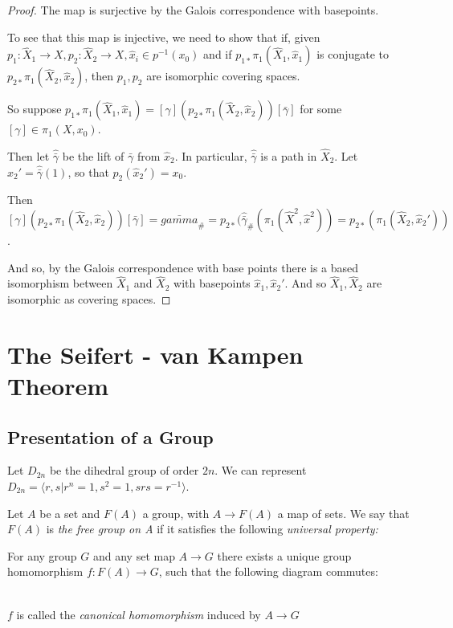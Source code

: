 \documentclass[10pt,a4paper]{article}
\begin{document}
\begin{proof}
The map is surjective by the Galois correspondence with basepoints.

To see that this map is injective, we need to show that if, given $p_1:\hat{X}_1 \to X, p_2:\hat{X}_2 \to X, \hat{x}_i \in p^{-1}(x_0)$ and if $p_{1\ast} \pi_1(\hat{X}_1, \hat{x}_1)$ is conjugate to $p_{2\ast} \pi_1(\hat{X}_2, \hat{x}_2)$, then $p_1, p_2$ are isomorphic covering spaces.

So suppose $p_{1\ast}\pi_1(\hat{X}_1, \hat{x}_1) = [\gamma](p_{2\ast}\pi_1(\hat{X}_2, \hat{x}_2))[\bar{\gamma}]$ for some $[\gamma]\in \pi_1(X, x_0)$.

Then let $\hat{\bar{\gamma}}$ be the lift of $\bar{\gamma}$ from $\hat{x}_2$. In particular, $\hat{\bar{\gamma}}$ is a path in $\hat{X}_2$. Let $\hat{x}_2' = \hat{\bar{\gamma}}(1)$, so that $p_2(\hat{x}_2') = x_0$.

Then $[\gamma](p_{2\ast}\pi_1(\hat{X}_2, \hat{x}_2))[\bar{\gamma}] = \bar{gamma}_{\#} = p_{2\ast}(\hat{\bar{\gamma}}_{\#}(\pi_1(\hat{X}^2, \hat{x}^2)) = p_{2\ast}(\pi_1(\hat{X}_2, \hat{x}_2'))$.

And so, by the Galois correspondence with base points there is a based isomorphism between $\hat{X}_1$ and $\hat{X}_2$ with basepoints $\hat{x}_1, \hat{x}_2'$. And so $\hat{X}_1, \hat{X}_2$ are isomorphic as covering spaces.
\end{proof}

\section{The Seifert - van Kampen Theorem}
\subsection*{Presentation of a Group}
Let $D_{2n}$ be the dihedral group of order $2n$. We can represent $D_{2n} = \langle r,s | r^n = 1, s^2 = 1, srs = r^{-1}\rangle$.

Let $A$ be a set and $F(A)$ a group, with $A \to F(A)$ a map of sets. We say that $F(A)$ is \emph{the free group on A} if it satisfies the following \emph{universal property:}
\begin{center}
For any group $G$ and any set map $A \to G$ there exists a unique group homomorphism $f:F(A) \to G$, such that the following diagram commutes:\\
\\
\end{center}
$f$ is called the \emph{canonical homomorphism} induced by $A \to G$
\end{document}
